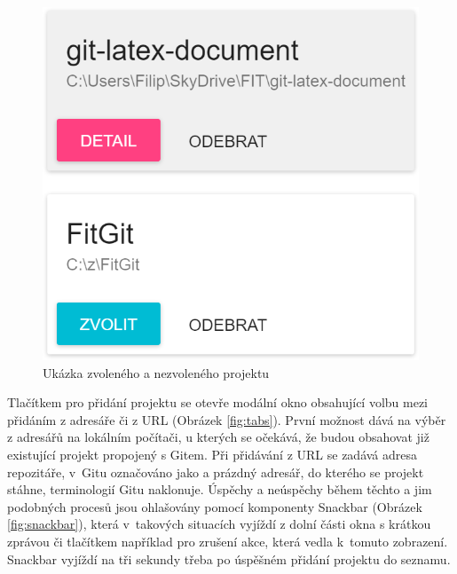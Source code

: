 \FloatBarrier
\begin{figure}[ht]
	\centering
	\includegraphics[scale=0.5]{sections/ui/images/projects.png}
	\caption[Projekty]{Ukázka zvoleného a nezvoleného projektu}
	\label{fig:projects}
\end{figure}
\FloatBarrier

Tlačítkem pro přidání projektu se otevře modální okno obsahující volbu mezi přidáním z adresáře či z URL (Obrázek \ref{fig:tabs}). První možnost dává na výběr z adresářů na lokálním počítači, u kterých se očekává, že budou obsahovat již existující projekt propojený s Gitem. Při přidávání z URL se zadává adresa repozitáře, v~Gitu označováno jako  a prázdný adresář, do kterého se projekt stáhne, terminologií Gitu naklonuje. Úspěchy a neúspěchy během těchto a jim podobných procesů jsou ohlašovány pomocí komponenty Snackbar (Obrázek \ref{fig:snackbar}), která v~takových situacích vyjíždí z dolní části okna s krátkou zprávou či tlačítkem například pro zrušení akce, která vedla k~tomuto zobrazení. Snackbar vyjíždí na tři sekundy třeba po úspěšném přidání projektu do seznamu.

